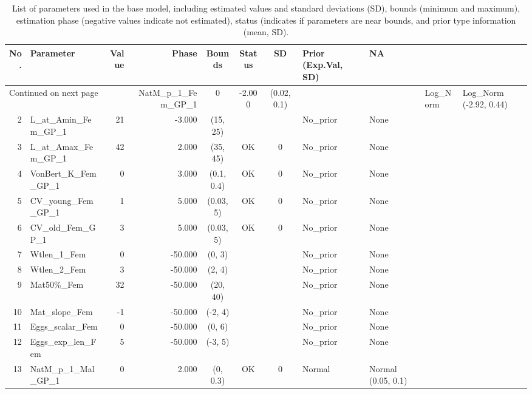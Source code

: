 \documentclass[12pt,]{article}
\begin{document}
\FloatBarrier

\begin{landscape}
\begin{longtable}{rlrrcccll}
\caption{List of parameters used in
                                          the base model, including estimated 
                                          values and standard deviations (SD), 
                                          bounds (minimum and maximum), 
                                          estimation phase (negative values indicate
                                          not estimated), status (indicates if 
                                          parameters are near bounds, and prior type
                                          information (mean, SD).} \\ 
  \hline
No. & Parameter & Value & Phase & Bounds & Status & SD & Prior (Exp.Val, SD)  & NA \\ 
  \hline 
\endhead 
\hline 
\multicolumn{3}{l}{\footnotesize Continued on next page} 
\endfoot 
\endlastfoot 
 \hline
1 & NatM\_p\_1\_Fem\_GP\_1 & 0 & -2.000 & (0.02, 0.1) &  &  & Log\_Norm & Log\_Norm (-2.92, 0.44) \\ 
  2 & L\_at\_Amin\_Fem\_GP\_1 & 21 & -3.000 & (15, 25) &  &  & No\_prior & None \\ 
  3 & L\_at\_Amax\_Fem\_GP\_1 & 42 & 2.000 & (35, 45) & OK & 0 & No\_prior & None \\ 
  4 & VonBert\_K\_Fem\_GP\_1 & 0 & 3.000 & (0.1, 0.4) & OK & 0 & No\_prior & None \\ 
  5 & CV\_young\_Fem\_GP\_1 & 1 & 5.000 & (0.03, 5) & OK & 0 & No\_prior & None \\ 
  6 & CV\_old\_Fem\_GP\_1 & 3 & 5.000 & (0.03, 5) & OK & 0 & No\_prior & None \\ 
  7 & Wtlen\_1\_Fem & 0 & -50.000 & (0, 3) &  &  & No\_prior & None \\ 
  8 & Wtlen\_2\_Fem & 3 & -50.000 & (2, 4) &  &  & No\_prior & None \\ 
  9 & Mat50\%\_Fem & 32 & -50.000 & (20, 40) &  &  & No\_prior & None \\ 
  10 & Mat\_slope\_Fem & -1 & -50.000 & (-2, 4) &  &  & No\_prior & None \\ 
  11 & Eggs\_scalar\_Fem & 0 & -50.000 & (0, 6) &  &  & No\_prior & None \\ 
  12 & Eggs\_exp\_len\_Fem & 5 & -50.000 & (-3, 5) &  &  & No\_prior & None \\ 
  13 & NatM\_p\_1\_Mal\_GP\_1 & 0 & 2.000 & (0, 0.3) & OK & 0 & Normal & Normal (0.05, 0.1) \\ 

\end{longtable}
\end{landscape}
\end{document}
